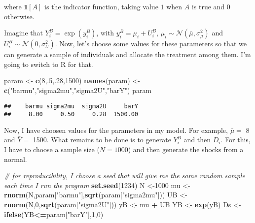 \documentclass[]{book}
\newenvironment{Shaded}{\begin{snugshade}}{\end{snugshade}}
\newcommand{\KeywordTok}[1]{\textcolor[rgb]{0.13,0.29,0.53}{\textbf{#1}}}
\newcommand{\DecValTok}[1]{\textcolor[rgb]{0.00,0.00,0.81}{#1}}
\newcommand{\StringTok}[1]{\textcolor[rgb]{0.31,0.60,0.02}{#1}}
\newcommand{\CommentTok}[1]{\textcolor[rgb]{0.56,0.35,0.01}{\textit{#1}}}
\newcommand{\OperatorTok}[1]{\textcolor[rgb]{0.81,0.36,0.00}{\textbf{#1}}}
\newcommand{\NormalTok}[1]{#1}
\newcommand{\uns}[1]{\mathds{1}[ #1 ]}
\theoremstyle{definition}
\theoremstyle{definition}
\theoremstyle{definition}
\theoremstyle{remark}
\let\BeginKnitrBlock\begin \let\EndKnitrBlock\end
\begin{document}
where \(\uns{A}\) is the indicator function, taking value \(1\) when
\(A\) is true and \(0\) otherwise.

\BeginKnitrBlock{example}[Sharp cutoff rule]
\protect\hypertarget{exm:unnamed-chunk-1}{}{\label{exm:unnamed-chunk-1}
\iffalse (Sharp cutoff rule) \fi{} }Imagine that \(Y_i^B=\exp(y_i^B)\),
with \(y_i^B=\mu_i+U_i^B\),
\(\mu_i\sim\mathcal{N}(\bar{\mu},\sigma^2_{\mu})\) and
\(U_i^B\sim\mathcal{N}(0,\sigma^2_{U})\). Now, let's choose some values
for these parameters so that we can generate a sample of individuals and
allocate the treatment among them. I'm going to switch to R for that.
\EndKnitrBlock{example}

\begin{Shaded}
\begin{Highlighting}[]
\NormalTok{param <-}\StringTok{ }\KeywordTok{c}\NormalTok{(}\DecValTok{8}\NormalTok{,.}\DecValTok{5}\NormalTok{,.}\DecValTok{28}\NormalTok{,}\DecValTok{1500}\NormalTok{)}
\KeywordTok{names}\NormalTok{(param) <-}\StringTok{ }\KeywordTok{c}\NormalTok{(}\StringTok{"barmu"}\NormalTok{,}\StringTok{"sigma2mu"}\NormalTok{,}\StringTok{"sigma2U"}\NormalTok{,}\StringTok{"barY"}\NormalTok{)}
\NormalTok{param}
\end{Highlighting}
\end{Shaded}

\begin{verbatim}
##    barmu sigma2mu  sigma2U     barY 
##     8.00     0.50     0.28  1500.00
\end{verbatim}

Now, I have choosen values for the parameters in my model. For example,
\(\bar{\mu}=\) 8 and \(\bar{Y}=\) 1500. What remains to be done is to
generate \(Y_i^B\) and then \(D_i\). For this, I have to choose a sample
size (\(N=1000\)) and then generate the shocks from a normal.

\begin{Shaded}
\begin{Highlighting}[]
\CommentTok{# for reproducibility, I choose a seed that will give me the same random sample each time I run the program}
\KeywordTok{set.seed}\NormalTok{(}\DecValTok{1234}\NormalTok{)}
\NormalTok{N <-}\DecValTok{1000}
\NormalTok{mu <-}\StringTok{ }\KeywordTok{rnorm}\NormalTok{(N,param[}\StringTok{"barmu"}\NormalTok{],}\KeywordTok{sqrt}\NormalTok{(param[}\StringTok{"sigma2mu"}\NormalTok{]))}
\NormalTok{UB <-}\StringTok{ }\KeywordTok{rnorm}\NormalTok{(N,}\DecValTok{0}\NormalTok{,}\KeywordTok{sqrt}\NormalTok{(param[}\StringTok{"sigma2U"}\NormalTok{]))}
\NormalTok{yB <-}\StringTok{ }\NormalTok{mu }\OperatorTok{+}\StringTok{ }\NormalTok{UB }
\NormalTok{YB <-}\StringTok{ }\KeywordTok{exp}\NormalTok{(yB)}
\NormalTok{Ds <-}\StringTok{ }\KeywordTok{ifelse}\NormalTok{(YB}\OperatorTok{<=}\NormalTok{param[}\StringTok{"barY"}\NormalTok{],}\DecValTok{1}\NormalTok{,}\DecValTok{0}\NormalTok{) }
\end{Highlighting}
\end{Shaded}
\end{document}
